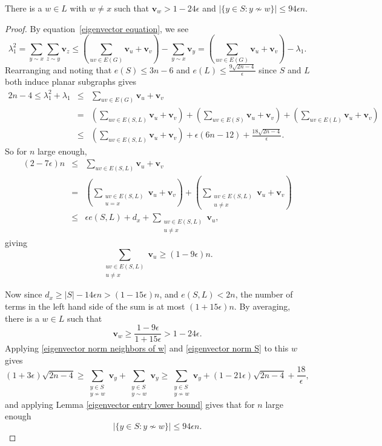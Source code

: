 \begin{lemma}\label{second vertex of large degree}
There is a $w\in L$ with $w\not=x$ such that $\mathbf{v}_w> 1-24\epsilon$ and $|\{y\in S: y\not\sim w\}| \leq 94\epsilon n$.
\end{lemma}
\begin{proof}
By equation~\eqref{eigenvector equation}, we see
\[
\lambda_1^2 = \sum_{y\sim x}\sum_{z\sim y} \mathbf{v}_z \leq \left(\sum_{uv\in E(G)} \mathbf{v}_u+\mathbf{v}_v\right) - \sum_{y\sim x} \mathbf{v}_y = \left(\sum_{uv\in E(G)} \mathbf{v}_u+\mathbf{v}_v\right) - \lambda_1.
\]
Rearranging and noting that $e(S) \leq 3n-6$ and $e(L) \leq \frac{9\sqrt{2n-4}}{\epsilon}$ since $S$ and $L$ both induce planar subgraphs gives
\begin{eqnarray*}
  2n-4\leq \lambda_1^2 + \lambda_1 &\leq & \sum_{uv\in E(G)} \mathbf{v}_u+\mathbf{v}_v \\
  & = & \left(\sum_{uv\in E(S,L)} \mathbf{v}_u+\mathbf{v}_v\right) + \left(\sum_{uv\in E(S)} \mathbf{v}_u+\mathbf{v}_v\right) + \left(\sum_{uv\in E(L)} \mathbf{v}_u+\mathbf{v}_v \right) \\
 &\leq & \left(\sum_{uv\in E(S,L)} \mathbf{v}_u+\mathbf{v}_v \right) + \epsilon(6n-12) + \frac{18\sqrt{2n-4}}{\epsilon}.
\end{eqnarray*}
So for $n$ large enough,
\begin{eqnarray*}
  (2-7\epsilon)n &\leq & \sum_{uv\in E(S,L)} \mathbf{v}_u+\mathbf{v}_v \\
  &=&  \left( \sum_{\substack{uv\in E(S,L)\\ u=x}} \mathbf{v}_u+\mathbf{v}_v\right) + \left(\sum_{\substack{uv\in E(S,L)\\ u\not= x}} \mathbf{v}_u+\mathbf{v}_v\right) \\
  & \leq & \epsilon e(S,L) + d_x + \sum_{\substack{uv\in E(S,L)\\ u\not= x} } \mathbf{v}_u,
\end{eqnarray*}
giving
\[
\sum_{\substack{uv\in E(S,L)\\ u\not = x}} \mathbf{v}_u \geq (1-9\epsilon)n.
\]

Now since $d_x \geq |S| - 14\epsilon n > (1-15\epsilon)n$, and $e(S,L) < 2n$, the number of terms in the left hand side of the sum is at most $(1+15\epsilon)n$. By averaging, there is a $w\in L$ such that 
\[
\mathbf{v}_w \geq \frac{1-9\epsilon}{1+15\epsilon} > 1-24\epsilon .
\]
Applying \eqref{eigenvector norm neighbors of w} and \eqref{eigenvector norm S} to this $w$ gives
\[
(1+3\epsilon) \sqrt{2n-4} \geq \sum_{\substack{y\in S\\ y\not\sim w}} \mathbf{v}_y + \sum_{\substack{y\in S\\ y\sim w}} \mathbf{v}_y \geq \sum_{\substack{y\in S\\ y\not\sim w}} \mathbf{v}_y + (1-21\epsilon)\sqrt{2n-4} + \frac{18}{\epsilon},
\]
and applying Lemma \ref{eigenvector entry lower bound} gives that for $n$ large enough
\[
|\{y\in S: y\not\sim w\}| \leq 94\epsilon n .
\]

\end{proof}
\medskip

